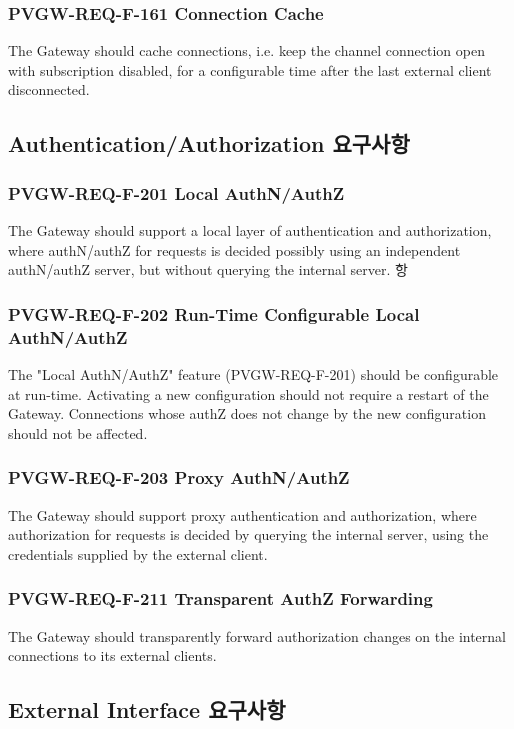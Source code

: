 \documentclass[11pt
  , a4paper
  , article
  , oneside
]{memoir}
\begin{document}
\subsubsection{PVGW-REQ-F-161 Connection Cache}
The Gateway should cache connections, i.e. keep the channel connection open with subscription disabled, for a configurable time after the last external client disconnected.


\subsection{Authentication/Authorization 요구사항}

\subsubsection{PVGW-REQ-F-201 Local AuthN/AuthZ}
The Gateway should support a local layer of authentication and authorization, where authN/authZ for requests is decided possibly using an independent authN/authZ server, but without querying the internal server.
항
\subsubsection{PVGW-REQ-F-202 Run-Time Configurable Local AuthN/AuthZ}
The "Local AuthN/AuthZ" feature (PVGW-REQ-F-201) should be configurable at run-time. Activating a new configuration should not require a restart of the Gateway. Connections whose authZ does not change by the new configuration should not be affected.

\subsubsection{PVGW-REQ-F-203 Proxy AuthN/AuthZ}
The Gateway should support proxy authentication and authorization, where authorization for requests is decided by querying the internal server, using the credentials supplied by the external client.

\subsubsection{PVGW-REQ-F-211 Transparent AuthZ Forwarding}
The Gateway should transparently forward authorization changes on the internal connections to its external clients.

\subsection{External Interface 요구사항}
\end{document}
